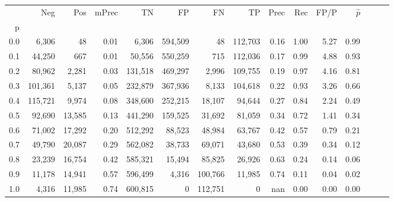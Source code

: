 \begin{tabular}{rrrrrrrrrrrrrrr}
\toprule
{} &      Neg &     Pos & mPrec &       TN &       FP &       FN &       TP &  Prec &   Rec &  FP/P & $\hat{p}$ \\
p   &          &         &       &          &          &          &          &       &       &       &           \\
\midrule
0.0 &    6,306 &      48 &  0.01 &    6,306 &  594,509 &       48 &  112,703 &  0.16 &  1.00 &  5.27 &      0.99 \\
0.1 &   44,250 &     667 &  0.01 &   50,556 &  550,259 &      715 &  112,036 &  0.17 &  0.99 &  4.88 &      0.93 \\
0.2 &   80,962 &   2,281 &  0.03 &  131,518 &  469,297 &    2,996 &  109,755 &  0.19 &  0.97 &  4.16 &      0.81 \\
0.3 &  101,361 &   5,137 &  0.05 &  232,879 &  367,936 &    8,133 &  104,618 &  0.22 &  0.93 &  3.26 &      0.66 \\
0.4 &  115,721 &   9,974 &  0.08 &  348,600 &  252,215 &   18,107 &   94,644 &  0.27 &  0.84 &  2.24 &      0.49 \\
0.5 &   92,690 &  13,585 &  0.13 &  441,290 &  159,525 &   31,692 &   81,059 &  0.34 &  0.72 &  1.41 &      0.34 \\
0.6 &   71,002 &  17,292 &  0.20 &  512,292 &   88,523 &   48,984 &   63,767 &  0.42 &  0.57 &  0.79 &      0.21 \\
0.7 &   49,790 &  20,087 &  0.29 &  562,082 &   38,733 &   69,071 &   43,680 &  0.53 &  0.39 &  0.34 &      0.12 \\
0.8 &   23,239 &  16,754 &  0.42 &  585,321 &   15,494 &   85,825 &   26,926 &  0.63 &  0.24 &  0.14 &      0.06 \\
0.9 &   11,178 &  14,941 &  0.57 &  596,499 &    4,316 &  100,766 &   11,985 &  0.74 &  0.11 &  0.04 &      0.02 \\
1.0 &    4,316 &  11,985 &  0.74 &  600,815 &        0 &  112,751 &        0 &   nan &  0.00 &  0.00 &      0.00 \\
\bottomrule
\end{tabular}
